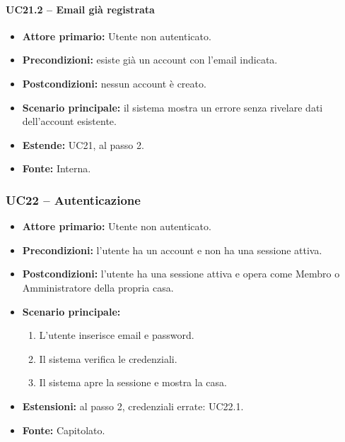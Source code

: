 \documentclass[12pt,a4paper]{article}
\newcommand{\tightlist}{\setlength{\itemsep}{1pt}\setlength{\parskip}{0pt}}
\begin{document}
\paragraph{UC21.2 -- Email già registrata}
\begin{itemize}
\tightlist
\item \textbf{Attore primario:} Utente non autenticato.
\item \textbf{Precondizioni:} esiste già un account con l'email indicata.
\item \textbf{Postcondizioni:} nessun account è creato.
\item \textbf{Scenario principale:} il sistema mostra un errore senza rivelare dati dell'account esistente.
\item \textbf{Estende:} UC21, al passo 2.
\item \textbf{Fonte:} Interna.
\end{itemize}

\subsubsection{UC22 -- Autenticazione}
\begin{itemize}
\tightlist
\item \textbf{Attore primario:} Utente non autenticato.
\item \textbf{Precondizioni:} l'utente ha un account e non ha una sessione attiva.
\item \textbf{Postcondizioni:} l'utente ha una sessione attiva e opera come Membro o Amministratore della propria casa.
\item \textbf{Scenario principale:}
\begin{enumerate}
\tightlist
\item L'utente inserisce email e password.
\item Il sistema verifica le credenziali.
\item Il sistema apre la sessione e mostra la casa.
\end{enumerate}
\item \textbf{Estensioni:} al passo 2, credenziali errate: UC22.1.
\item \textbf{Fonte:} Capitolato.
\end{itemize}
\end{document}
